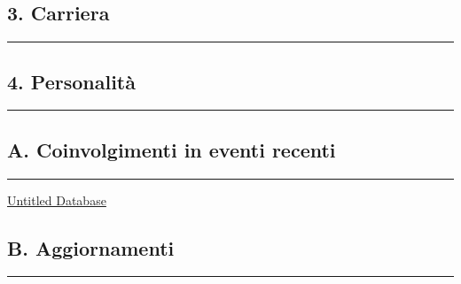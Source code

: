 \subsection{3. Carriera}\label{carriera}

\begin{center}\rule{0.5\linewidth}{0.5pt}\end{center}

\subsection{4. Personalità}\label{personalituxe0}

\begin{center}\rule{0.5\linewidth}{0.5pt}\end{center}

\subsection{A. Coinvolgimenti in eventi
recenti}\label{a.-coinvolgimenti-in-eventi-recenti}

\begin{center}\rule{0.5\linewidth}{0.5pt}\end{center}

\href{Untitled\%20Database\%20ca9cae84324f400cab8a33943de865ba.csv}{Untitled
Database}

\subsection{B. Aggiornamenti}\label{b.-aggiornamenti}

\begin{center}\rule{0.5\linewidth}{0.5pt}\end{center}

\href{Untitled\%20c6c5b00f95474402853e4e6d21c070a6.csv}{}
